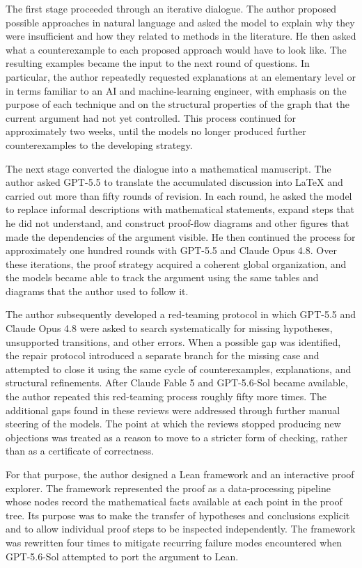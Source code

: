 \documentclass[11pt]{article}
\begin{document}
The first stage proceeded through an iterative dialogue.  The author proposed
possible approaches in natural language and asked the model to explain why
they were insufficient and how they related to methods in the literature.  He
then asked what a counterexample to each proposed approach would have to look
like.  The resulting examples became the input to the next round of questions.
In particular, the author repeatedly requested explanations at an elementary
level or in terms familiar to an AI and machine-learning engineer, with
emphasis on the purpose of each technique and on the structural properties of
the graph that the current argument had not yet controlled.  This process
continued for approximately two weeks, until the models no longer produced
further counterexamples to the developing strategy.

The next stage converted the dialogue into a mathematical manuscript.  The
author asked GPT-5.5 to translate the accumulated discussion into LaTeX and
carried out more than fifty rounds of revision.  In each round, he asked the
model to replace informal descriptions with mathematical statements, expand
steps that he did not understand, and construct proof-flow diagrams and other
figures that made the dependencies of the argument visible.  He then continued
the process for approximately one hundred rounds with GPT-5.5 and Claude Opus
4.8.  Over these iterations, the proof strategy acquired a coherent global
organization, and the models became able to track the argument using the same
tables and diagrams that the author used to follow it.

The author subsequently developed a red-teaming protocol in which GPT-5.5 and
Claude Opus 4.8 were asked to search systematically for missing hypotheses,
unsupported transitions, and other errors.  When a possible gap was identified,
the repair protocol introduced a separate branch for the missing case and
attempted to close it using the same cycle of counterexamples, explanations,
and structural refinements.  After Claude Fable 5 and GPT-5.6-Sol became
available, the author repeated this red-teaming process roughly fifty more
times.  The additional gaps found in these reviews were addressed through
further manual steering of the models.  The point at which the reviews stopped
producing new objections was treated as a reason to move to a stricter form of
checking, rather than as a certificate of correctness.

For that purpose, the author designed a Lean framework and an interactive proof
explorer.  The framework represented the proof as a data-processing pipeline
whose nodes record the mathematical facts available at each point in the proof
tree.  Its purpose was to make the transfer of hypotheses and conclusions
explicit and to allow individual proof steps to be inspected independently.
The framework was rewritten four times to mitigate recurring failure modes
encountered when GPT-5.6-Sol attempted to port the argument to Lean.
\end{document}
